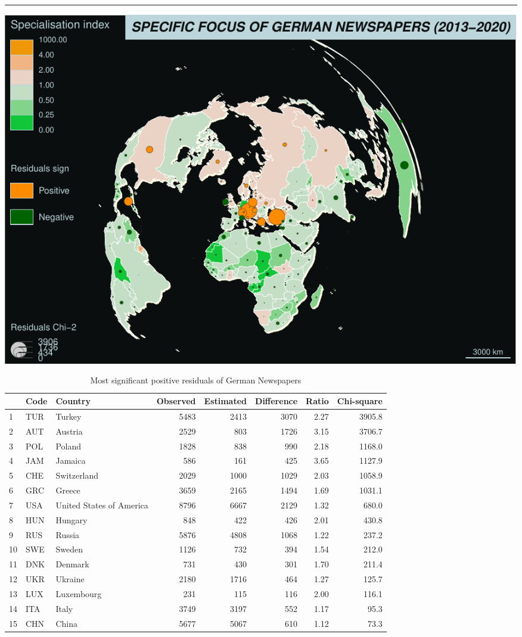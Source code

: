 \documentclass[
]{article}
\begin{document}
\begin{center}\rule{0.5\linewidth}{0.5pt}\end{center}

\includegraphics{Part2_maps_files/figure-latex/unnamed-chunk-17-1.pdf}

\begin{table}

\caption{\label{tab:unnamed-chunk-18}Most significant positive residuals of German Newspapers}
\centering
\begin{tabular}[t]{l|l|l|r|r|r|r|r}
\hline
  & Code & Country & Observed & Estimated & Difference & Ratio & Chi-square\\
\hline
1 & TUR & Turkey & 5483 & 2413 & 3070 & 2.27 & 3905.8\\
\hline
2 & AUT & Austria & 2529 & 803 & 1726 & 3.15 & 3706.7\\
\hline
3 & POL & Poland & 1828 & 838 & 990 & 2.18 & 1168.0\\
\hline
4 & JAM & Jamaica & 586 & 161 & 425 & 3.65 & 1127.9\\
\hline
5 & CHE & Switzerland & 2029 & 1000 & 1029 & 2.03 & 1058.9\\
\hline
6 & GRC & Greece & 3659 & 2165 & 1494 & 1.69 & 1031.1\\
\hline
7 & USA & United States of America & 8796 & 6667 & 2129 & 1.32 & 680.0\\
\hline
8 & HUN & Hungary & 848 & 422 & 426 & 2.01 & 430.8\\
\hline
9 & RUS & Russia & 5876 & 4808 & 1068 & 1.22 & 237.2\\
\hline
10 & SWE & Sweden & 1126 & 732 & 394 & 1.54 & 212.0\\
\hline
11 & DNK & Denmark & 731 & 430 & 301 & 1.70 & 211.4\\
\hline
12 & UKR & Ukraine & 2180 & 1716 & 464 & 1.27 & 125.7\\
\hline
13 & LUX & Luxembourg & 231 & 115 & 116 & 2.00 & 116.1\\
\hline
14 & ITA & Italy & 3749 & 3197 & 552 & 1.17 & 95.3\\
\hline
15 & CHN & China & 5677 & 5067 & 610 & 1.12 & 73.3\\
\hline
\end{tabular}
\end{table}
\end{document}
